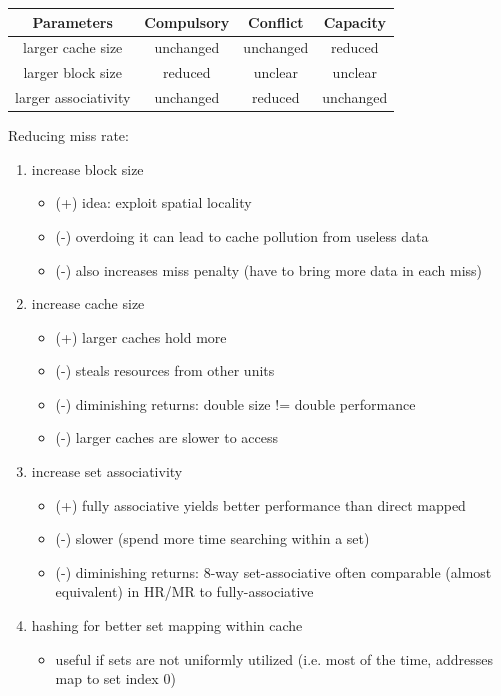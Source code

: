 \documentclass[12pt]{extarticle}
\begin{document}
	\begin{tabular}[ht!]{|c|c|c|c|} \hline
		Parameters				& Compulsory	& Conflict		& Capacity		\\ \hline
		larger cache size		& unchanged		& unchanged		& reduced		\\ \hline
		larger block size		& reduced		& unclear		& unclear		\\ \hline
		larger associativity	& unchanged		& reduced		& unchanged		\\ \hline
	\end{tabular}

	\noindent Reducing miss rate:

	\begin{enumerate}
		\item increase block size
		\begin{itemize}
			\item (+) idea: exploit spatial locality
			\item (-) overdoing it can lead to cache pollution from useless data
			\item (-) also increases miss penalty (have to bring more data in each miss)
		\end{itemize}

		\item increase cache size
		\begin{itemize}
			\item (+) larger caches hold more
			\item (-) steals resources from other units
			\item (-) diminishing returns: double size != double performance
			\item (-) larger caches are slower to access
		\end{itemize}

		\item increase set associativity
		\begin{itemize}
			\item (+) fully associative yields better performance than direct mapped
			\item (-) slower (spend more time searching within a set)
			\item (-) diminishing returns: 8-way set-associative often comparable (almost equivalent) in HR/MR to fully-associative
		\end{itemize}

		\item hashing for better set mapping within cache
		\begin{itemize}
			\item useful if sets are not uniformly utilized (i.e. most of the time, addresses map to set index 0)
		\end{itemize}


\end{enumerate}
\end{document}
